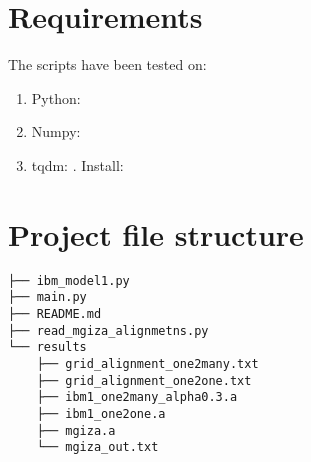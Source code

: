 \documentclass{article}[a4paper]
\begin{document}
\section{Requirements}
The scripts have been tested on:
\begin{enumerate}
    \item Python: 
    \item Numpy: 
    \item tqdm: . Install: 
\end{enumerate}

\section{Project file structure}
\begin{Verbatim}
├── ibm_model1.py
├── main.py
├── README.md
├── read_mgiza_alignmetns.py
└── results
    ├── grid_alignment_one2many.txt
    ├── grid_alignment_one2one.txt
    ├── ibm1_one2many_alpha0.3.a
    ├── ibm1_one2one.a
    ├── mgiza.a
    └── mgiza_out.txt
 \end{Verbatim}
\end{document}
